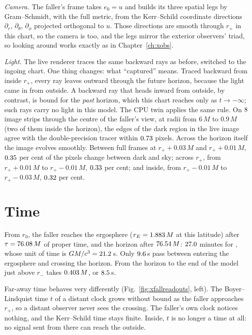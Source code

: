 \emph{Camera.} The faller's frame takes $e_0 = u$ and builds its three spatial
legs by Gram--Schmidt, with the full metric, from the Kerr--Schild coordinate
directions $\partial_r$, $\partial_\theta$, $\partial_\phi$ projected
orthogonal to $u$. Those directions are smooth through $r_+$ in this chart, so
the camera is too, and the legs mirror the exterior observers' triad, so
looking around works exactly as in Chapter~\ref{ch:xobs}.

\emph{Light.} The live renderer traces the same backward rays as before,
switched to the ingoing chart. One thing changes: what ``captured'' means.
Traced backward from inside $r_+$, every ray leaves outward through the future
horizon, because the light came in from outside. A backward ray that heads
inward from outside, by contrast, is bound for the \emph{past} horizon, which
this chart reaches only as $t \to -\infty$; such rays carry no light in this
model. The CPU twin applies the same rule. On $8$ image strips
through the centre of the faller's view, at radii from $6\,M$ to $0.9\,M$
(two of them inside the horizon), the edges of the dark region in the live
image agree with the double-precision tracer within $0.73$ pixels.
Across the horizon itself the image evolves smoothly. Between full frames at
$r_+ + 0.03\,M$ and $r_+ + 0.01\,M$, $0.35$ per cent of the pixels
change between dark and sky; across $r_+$, from $r_+ + 0.01\,M$ to
$r_+ - 0.01\,M$, $0.33$ per cent; and inside, from $r_+ - 0.01\,M$
to $r_+ - 0.03\,M$, $0.32$ per cent.

\section{Time}

From $r_0$, the faller reaches the ergosphere ($r_E = 1.883\,M$ at this
latitude) after $\tau = 76.08\,M$ of proper time, and the horizon after
$76.54\,M$: $27.0$ minutes for \sgra{}, whose unit of time is
$GM/c^3 = 21.2$\,s. Only $9.6$\,s pass between entering the
ergosphere and crossing the horizon. From the horizon to the end of the model
just above $r_-$ takes $0.403\,M$, or $8.5$\,s.

Far-away time behaves very differently (Fig.~\ref{fig:xfallreadouts}, left).
The Boyer--Lindquist time $t$ of a distant clock grows without bound as the
faller approaches $r_+$, so a distant observer never sees the crossing. The
faller's own clock notices nothing, and the Kerr--Schild time stays finite.
Inside, $t$ is no longer a time at all: no signal sent from there can reach
the outside.

